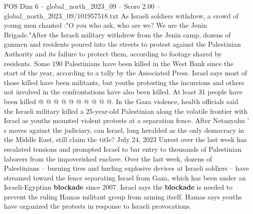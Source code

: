 \begin{textsample}{POS Dim 6 – global\_north\_2023\_09 – Score 2.00 – global\_north\_2023\_09/101957518.txt}
As Israeli soldiers withdrew, a crowd of young men chanted :"O you who ask, who are we?
We are the Jenin Brigade."After the Israeli military withdrew from the Jenin camp, dozens of gunmen and residents poured into the streets to protest against the Palestinian Authority and its failure to protect them, according to footage shared by residents.
Some 190 Palestinians have been killed in the West Bank since the start of the year, according to a tally by the Associated Press.
Israel says most of those killed have been militants, but youths protesting the incursions and others not involved in the confrontations have also been killed.
At least 31 people have been killed @ @ @ @ @ @ @ @ @ @.
In the Gaza violence, health officials said the Israeli military killed a 25-year-old Palestinian along the volatile frontier with Israel as youths mounted violent protests at a separation fence.
After Netanyahu ' s moves against the judiciary, can Israel, long heralded as the only democracy in the Middle East, still claim the title?
July 24, 2023 Unrest over the last week has escalated tensions and prompted Israel to bar entry to thousands of Palestinian laborers from the impoverished enclave.
Over the last week, dozens of Palestinians -- burning tires and hurling explosive devices at Israeli soldiers -- have streamed toward the fence separating Israel from Gaza, which has been under an Israeli-Egyptian \textbf{blockade} since 2007.
Israel says the \textbf{blockade} is needed to prevent the ruling Hamas militant group from arming itself.
Hamas says youths have organized the protests in response to Israeli provocations.

\end{textsample}
